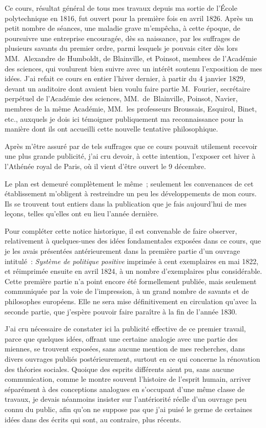 \documentclass[french,twoside]{book} %
\begin{document}
\noindent Ce cours, résultat général de tous mes travaux depuis ma sortie de l’École polytechnique en 1816, fut ouvert pour la première fois en avril 1826. Après un petit nombre de séances, une maladie grave m’empêcha, à cette époque, de poursuivre une entreprise encouragée, dès sa naissance, par les suffrages de plusieurs savants du premier ordre, parmi lesquels je pouvais citer dès lors MM. Alexandre de Humboldt, de Blainville, et Poinsot, membres de l’Académie des sciences, qui voulurent bien suivre avec un intérêt soutenu l’exposition de mes idées. J’ai refait ce cours en entier l’hiver dernier, à partir du 4 janvier 1829, devant un auditoire dont avaient bien voulu faire partie M. Fourier, secrétaire perpétuel de l’Académie des sciences, MM. de Blainville, Poinsot, Navier, membres de la même Académie, MM. les professeurs Broussais, Esquirol, Binet, etc., auxquels je dois ici témoigner publiquement ma reconnaissance pour la manière dont ils ont accueilli cette nouvelle tentative philosophique.\par
Après m’être assuré par de tels suffrages que ce cours pouvait utilement recevoir une plus grande publicité, j’ai cru devoir, à cette intention, l’exposer cet hiver à l’Athénée royal de Paris, où il vient d’être ouvert le 9 décembre.\par
Le plan est demeuré complètement le même ; seulement les convenances de cet établissement m’obligent à restreindre un peu les développements de mon cours. Ils se trouvent tout entiers dans la publication que je fais aujourd’hui de mes leçons, telles qu’elles ont eu lieu l’année dernière.\par
Pour compléter cette notice historique, il est convenable de faire observer, relativement à quelques-unes des idées fondamentales exposées dans ce cours, que je les avais présentées antérieurement dans la première partie d’un ouvrage intitulé : \emph{Système de politique positive} imprimée à cent exemplaires en mai 1822, et réimprimée ensuite en avril 1824, à un nombre d’exemplaires plus considérable. Cette première partie n’a point encore été formellement publiée, mais seulement communiquée par la voie de l’impression, à un grand nombre de savants et de philosophes européens. Elle ne sera mise définitivement en circulation qu’avec la seconde partie, que j’espère pouvoir faire paraître à la fin de l’année 1830.\par
J’ai cru nécessaire de constater ici la publicité effective de ce premier travail, parce que quelques idées, offrant une certaine analogie avec une partie des miennes, se trouvent exposées, sans aucune mention de mes recherches, dans divers ouvrages publiés postérieurement, surtout en ce qui concerne la rénovation des théories sociales. Quoique des esprits différents aient pu, sans aucune communication, comme le montre souvent l’histoire de l’esprit humain, arriver séparément à des conceptions analogues en s’occupant d’une même classe de travaux, je devais néanmoins insister sur l’antériorité réelle d’un ouvrage peu connu du public, afin qu’on ne suppose pas que j’ai puisé le germe de certaines idées dans des écrits qui sont, au contraire, plus récents.\par
\end{document}

